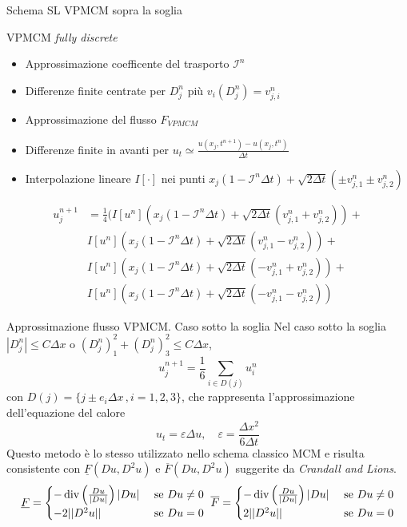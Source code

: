 \begin{frame}{Schema SL VPMCM sopra la soglia}
  \begin{alertblock}{VPMCM \emph{fully discrete}}
    \begin{itemize}
    \item Approssimazione coefficente del trasporto $\mathcal{I}^n$
    \item Differenze finite centrate per $D_j^n$ più
      $v_i(D_j^n)=v_{j,i}^n$
    \item Approssimazione del flusso $F_{VPMCM}$
    \item Differenze finite in avanti per
      $u_t\simeq\frac{u(x_j,t^{n+1})-u(x_j,t^n)}{\Delta t}$
    \item Interpolazione lineare $I[\cdot]$ nei punti
      $x_j(1-\mathcal{I}^n\Delta t)+\sqrt{2\Delta t}(\pm
      v_{j,1}^n\pm v_{j,2}^n)$
    \end{itemize}
    \[
    \begin{aligned}
        u_j^{n+1}&=\frac{1}{4}(I[u^n](x_j(1-\mathcal{I}^n\Delta t)+\sqrt{2\Delta
          t}(v_{j,1}^n+v_{j,2}^n))+ \\
        &I[u^n](x_j(1-\mathcal{I}^n\Delta t)+\sqrt{2\Delta
          t}(v_{j,1}^n-v_{j,2}^n))+\\
        &I[u^n](x_j(1-\mathcal{I}^n\Delta t)+\sqrt{2\Delta
          t}(-v_{j,1}^n+v_{j,2}^n))+\\
        &I[u^n](x_j(1-\mathcal{I}^n\Delta t)+\sqrt{2\Delta
          t}(-v_{j,1}^n-v_{j,2}^n))
    \end{aligned}
    \]
  \end{alertblock}
\end{frame}
 
\begin{frame}{Approssimazione flusso VPMCM. Caso sotto la soglia}
  Nel caso sotto la soglia $|D_j^n|\leq C\Delta x$ o
  $(D_j^n)_1^2+(D_j^n)_3^2\leq C\Delta x$, 
  \[
  u_j^{n+1}=\frac{1}{6}\sum_{i\in D(j)}u_i^n
  \]
con $D(j)=\{j\pm e_i\Delta x\,,i=1,2,3\}$, che rappresenta
l'approssimazione dell'equazione del calore
\[
u_t=\varepsilon \Delta u,\quad \varepsilon=\frac{\Delta x^2}{6\Delta t}
\]
Questo metodo è lo stesso utilizzato nello schema classico MCM e 
risulta consistente con $\underline{F}(Du,D^2u)$ e
$\overline{F}(Du,D^2u)$ suggerite da \emph{Crandall and Lions}.
\[
\underline{F}=
\begin{cases}
-\operatorname{div}\left(\frac{Du}{|Du|}\right)|Du| &\text{ se }Du\neq 0\\
-2||D^2u|| &\text{ se }Du=0
\end{cases}\,\,
\overline{F}=
\begin{cases}
-\operatorname{div}\left(\frac{Du}{|Du|}\right)|Du| &\text{ se }Du\neq 0\\
2||D^2u|| &\text{ se }Du=0
\end{cases}
\]
\end{frame}

